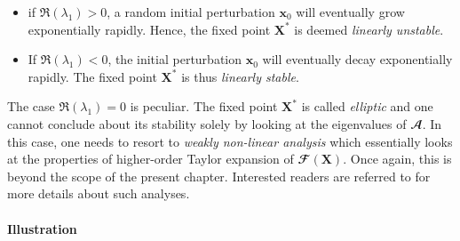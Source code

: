   \begin{itemize}
    \item if $\Re \left( \lambda_1 \right) > 0$, a random initial perturbation $\mathbf{x}_0$ will eventually grow exponentially rapidly. Hence, the fixed point $\mathbf{X}^*$ is deemed \emph{linearly unstable}.

    \item If $\Re \left( \lambda_1 \right) < 0$, the initial perturbation $\mathbf{x}_0$ will eventually decay exponentially rapidly. The fixed point $\mathbf{X}^*$ is thus \emph{linearly stable}.
  \end{itemize}
  The case $\Re \left( \lambda_1 \right) = 0$ is peculiar. The fixed point $\mathbf{X}^*$ is called \emph{elliptic} and one cannot conclude about its stability solely by looking at the eigenvalues of $\mathbfcal{A}$. In this case, one needs to resort to \emph{weakly non-linear analysis} which essentially looks at the properties of higher-order Taylor expansion of $\mathbfcal{F} \left( \mathbf{X} \right)$. Once again, this is beyond the scope of the present chapter. Interested readers are referred to \cite{??} for more details about such analyses.

  \paragraph*{Illustration}

